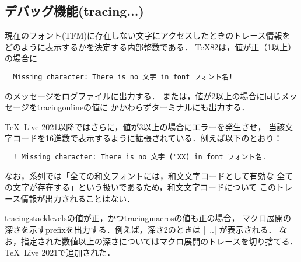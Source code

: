 \documentclass[a4paper,11pt,nomag,dvipdfmx]{jsarticle}
\begin{document}
\subsection{デバッグ機能(\.{tracing...})}
\begin{cslist}
  現在のフォント(TFM)に存在しない文字にアクセスしたときのトレース情報を
  どのように表示するかを決定する内部整数である．
  \TeX82は，値が正（1以上）の場合に
\begin{verbatim}
  Missing character: There is no 文字 in font フォント名!
\end{verbatim}
  のメッセージをログファイルに出力する．
  また\eTeX は，値が2以上の場合に同じメッセージを\.{tracingonline}の値に
  かかわらずターミナルにも出力する．

  \TeX~Live 2021以降ではさらに，値が3以上の場合にエラーを発生させ，
  当該文字コードを16進数で表示するように拡張されている．例えば以下のとおり：
\begin{verbatim}
  ! Missing character: There is no 文字 ("XX) in font フォント名.
\end{verbatim}

  なお，\pTeX 系列では「全ての和文フォントには，和文文字コードとして有効な
  全ての文字が存在する」という扱いであるため，和文文字コードについて
  このトレース情報が出力されることはない．

  \.{tracingstacklevels}の値が正，かつ\.{tracingmacros}の値も正の場合，
  マクロ展開の深さを示すprefixを出力する．例えば，深さ2のときは |~..| が表示される．
  なお，指定された数値以上の深さについてはマクロ展開のトレースを切り捨てる．
  \TeX~Live 2021で追加された．
\end{cslist}
\end{document}
